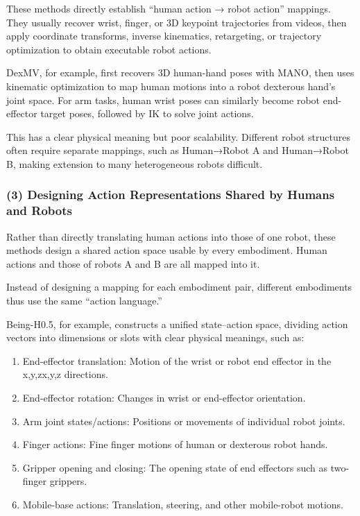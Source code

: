 These methods directly establish ``human action → robot action'' mappings. They usually recover wrist, finger, or 3D keypoint trajectories from videos, then apply coordinate transforms, inverse kinematics, retargeting, or trajectory optimization to obtain executable robot actions.

DexMV, for example, first recovers 3D human-hand poses with MANO, then uses kinematic optimization to map human motions into a robot dexterous hand's joint space. For arm tasks, human wrist poses can similarly become robot end-effector target poses, followed by IK to solve joint actions.

This has a clear physical meaning but poor scalability. Different robot structures often require separate mappings, such as Human→Robot A and Human→Robot B, making extension to many heterogeneous robots difficult.

\hypertarget{designing-action-representations-shared-by-humans-and-robots}{%
\subsubsection{(3) Designing Action Representations Shared by Humans and Robots}\label{designing-action-representations-shared-by-humans-and-robots}}

Rather than directly translating human actions into those of one robot, these methods design a shared action space usable by every embodiment. Human actions and those of robots A and B are all mapped into it.

Instead of designing a mapping for each embodiment pair, different embodiments thus use the same ``action language.''

Being-H0.5, for example, constructs a unified state--action space, dividing action vectors into dimensions or slots with clear physical meanings, such as:

\begin{enumerate}
\def\labelenumi{\arabic{enumi}.}
\item
  End-effector translation: Motion of the wrist or robot end effector in the x,y,zx,y,z directions.
\item
  End-effector rotation: Changes in wrist or end-effector orientation.
\item
  Arm joint states/actions: Positions or movements of individual robot joints.
\item
  Finger actions: Fine finger motions of human or dexterous robot hands.
\item
  Gripper opening and closing: The opening state of end effectors such as two-finger grippers.
\item
  Mobile-base actions: Translation, steering, and other mobile-robot motions.
\end{enumerate}

